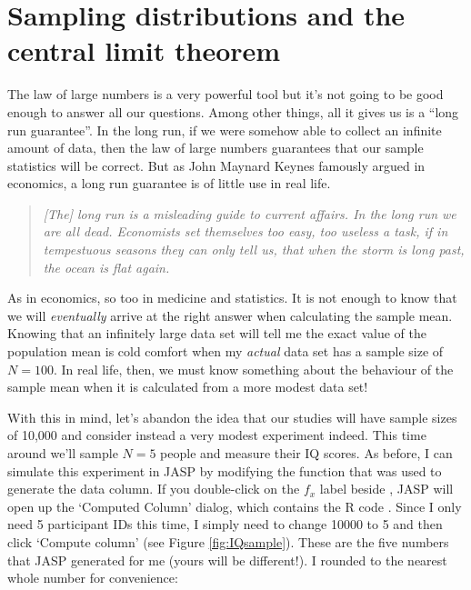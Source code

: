 \section{Sampling distributions and the central limit theorem~\label{sec:samplesandclt}}

The law of large numbers is a very powerful tool but it's not going to be good enough to answer all our questions. Among other things, all it gives us is a ``long run guarantee''. In the long run, if we were somehow able to collect an infinite amount of data, then the law of large numbers guarantees that our sample statistics will be correct. But as John Maynard Keynes famously argued in economics, a long run guarantee is of little use in real life.
\begin{quote}
{\it [The] long run is a misleading guide to current affairs. In the long run we are all dead. Economists set themselves too easy, too useless a task, if in tempestuous seasons they can only tell us, that when the storm is long past, the ocean is flat again.} \parencite[p.~80]{Keynes1923}
\end{quote}
As in economics, so too in medicine and statistics. It is not enough to know that we will {\it eventually} arrive at the right answer when calculating the sample mean. Knowing that an infinitely large data set will tell me the exact value of the population mean is cold comfort when my {\it actual} data set has a sample size of $N=100$. In real life, then, we must know something about the behaviour of the sample mean when it is calculated from a more modest data set!


With this in mind, let's abandon the idea that our studies will have sample sizes of 10,000 and consider instead a very modest experiment indeed. This time around we'll sample $N=5$ people and measure their IQ scores. As before, I can simulate this experiment in JASP by modifying the  function that was used to generate the  data column.  If you double-click on the $f_x$ label beside , JASP will open up the `Computed Column' dialog, which contains the R code .  Since I only need 5 participant IDs this time, I simply need to change 10000 to 5 and then click `Compute column' (see Figure \ref{fig:IQsample}).  These are the five numbers that JASP generated for me (yours will be different!). I rounded to the nearest whole number for convenience:

